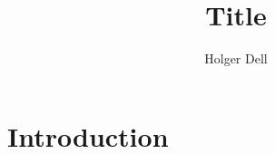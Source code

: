 \documentclass[a4paper,USenglish]{lipics-v2018}
\title{Title}
\author{Holger Dell}{Saarland University and Cluster of Excellence (MMCI), Saarbrücken, Germany}{hdell@mmci.uni-saarland.de}{https://orcid.org/0000-0001-8955-0786}{}
\begin{document}
\maketitle

\begin{abstract}
\end{abstract}

 
\section{Introduction}



\end{document}
